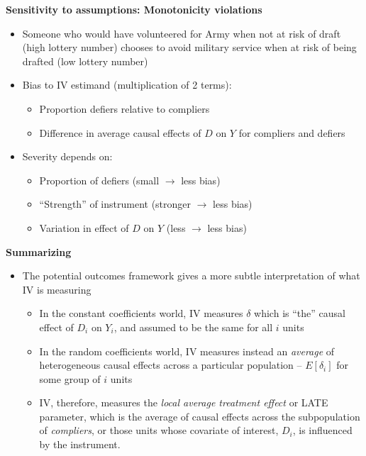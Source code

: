 \documentclass[notes=show]{beamer}
\begin{document}
\begin{frame}[plain]
	\begin{center}
	\textbf{Sensitivity to assumptions: Monotonicity violations}
	\end{center}

\begin{itemize}

\item Someone who would have volunteered for Army when not at risk of draft (high lottery number) chooses to avoid military service when at risk of being drafted (low lottery number)
	
\item Bias to IV estimand (multiplication of 2 terms):
		\begin{itemize}
		\item Proportion defiers relative to compliers
		\item Difference in average causal effects of $D$ on $Y$ for compliers and defiers
		\end{itemize}
\item Severity depends on:
		\begin{itemize}
		\item Proportion of defiers (small $\rightarrow$ less bias)
		\item ``Strength'' of instrument (stronger $\rightarrow$ less bias)
		\item Variation in effect of $D$ on $Y$ (less $\rightarrow$ less bias)
		\end{itemize}
\end{itemize}
		
\end{frame}


		
		
	
		


\begin{frame}[plain]

	\begin{center}
	\textbf{Summarizing}
	\end{center}

	\begin{itemize}
	\item The potential outcomes framework gives a more subtle interpretation of what IV is measuring
		\begin{itemize}
		\item In the constant coefficients world, IV measures $\delta$ which is ``the'' causal effect of $D_i$ on $Y_i$, and assumed to be the same for all $i$ units
		\item In the random coefficients world, IV measures instead an \emph{average} of heterogeneous causal effects across a particular population -- $E[\delta_i]$ for some group of $i$ units
	\item IV, therefore, measures the \emph{local average treatment effect} or LATE parameter, which is the average of causal effects across the subpopulation of \emph{compliers}, or those units whose covariate of interest, $D_i$, is influenced by the instrument. 
		\end{itemize}
	\end{itemize}

\end{frame}
\end{document}
